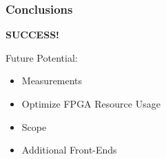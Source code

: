 \begin{frame}
    \frametitle{Conclusions}
    \begin{overprint}
        \centering
        \Huge\textbf{SUCCESS!}
    \end{overprint}

    \begin{overprint}
        \centering
        \vspace{1em}
        Future Potential:
        \begin{itemize}
            \item Measurements
            \item Optimize FPGA Resource Usage %
            \item Scope %
            \item Additional Front-Ends
        \end{itemize}
    \end{overprint}
\end{frame}
